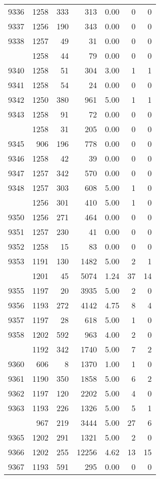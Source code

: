 \documentclass[
]{article}
\begin{document}
\begin{table}
\begin{tabular}[t]{lrrrrrr}
9336 & 1258 & 333 & 313 & 0.00 & 0 & 0\\
9337 & 1256 & 190 & 343 & 0.00 & 0 & 0\\
9338 & 1257 & 49 & 31 & 0.00 & 0 & 0\\
\addlinespace
9339 & 1258 & 44 & 79 & 0.00 & 0 & 0\\
9340 & 1258 & 51 & 304 & 3.00 & 1 & 1\\
9341 & 1258 & 54 & 24 & 0.00 & 0 & 0\\
9342 & 1250 & 380 & 961 & 5.00 & 1 & 1\\
9343 & 1258 & 91 & 72 & 0.00 & 0 & 0\\
\addlinespace
9344 & 1258 & 31 & 205 & 0.00 & 0 & 0\\
9345 & 906 & 196 & 778 & 0.00 & 0 & 0\\
9346 & 1258 & 42 & 39 & 0.00 & 0 & 0\\
9347 & 1257 & 342 & 570 & 0.00 & 0 & 0\\
9348 & 1257 & 303 & 608 & 5.00 & 1 & 0\\
\addlinespace
9349 & 1256 & 301 & 410 & 5.00 & 1 & 0\\
9350 & 1256 & 271 & 464 & 0.00 & 0 & 0\\
9351 & 1257 & 230 & 41 & 0.00 & 0 & 0\\
9352 & 1258 & 15 & 83 & 0.00 & 0 & 0\\
9353 & 1191 & 130 & 1482 & 5.00 & 2 & 1\\
\addlinespace
9354 & 1201 & 45 & 5074 & 1.24 & 37 & 14\\
9355 & 1197 & 20 & 3935 & 5.00 & 2 & 0\\
9356 & 1193 & 272 & 4142 & 4.75 & 8 & 4\\
9357 & 1197 & 28 & 618 & 5.00 & 1 & 0\\
9358 & 1202 & 592 & 963 & 4.00 & 2 & 0\\
\addlinespace
9359 & 1192 & 342 & 1740 & 5.00 & 7 & 2\\
9360 & 606 & 8 & 1370 & 1.00 & 1 & 0\\
9361 & 1190 & 350 & 1858 & 5.00 & 6 & 2\\
9362 & 1197 & 120 & 2202 & 5.00 & 4 & 0\\
9363 & 1193 & 226 & 1326 & 5.00 & 5 & 1\\
\addlinespace
9364 & 967 & 219 & 3444 & 5.00 & 27 & 6\\
9365 & 1202 & 291 & 1321 & 5.00 & 2 & 0\\
9366 & 1202 & 255 & 12256 & 4.62 & 13 & 15\\
9367 & 1193 & 591 & 295 & 0.00 & 0 & 0\\

\end{tabular}
\end{table}
\end{document}
